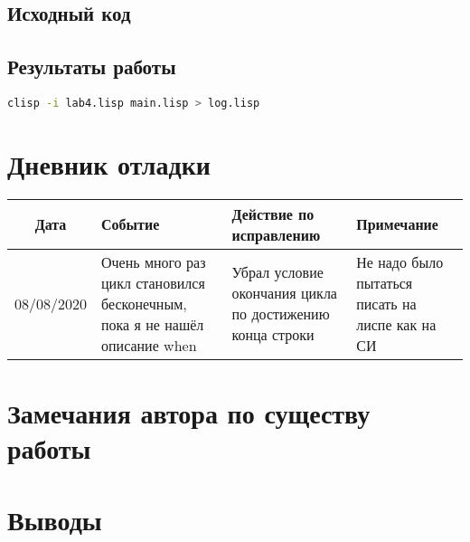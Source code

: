 \documentclass[12pt]{article}
\begin{document}
\subsection{Исходный код}

\subsection{Результаты работы}
\lstinline[language=sh]{clisp -i lab4.lisp main.lisp > log.lisp}

\section{Дневник отладки}
\noindent
\begin{tabularx}{\linewidth}{|c|X|X|X|}
\hline
Дата & Событие & Действие по исправлению & Примечание \\
\hline
08/08/2020 & 
Очень много раз цикл становился бесконечным, пока я не нашёл описание when &
Убрал условие окончания цикла по достижению конца строки&
Не надо было пытаться писать на лиспе как на СИ\\
\hline
\end{tabularx}

\section{Замечания автора по существу работы}

\section{Выводы}
\end{document}
